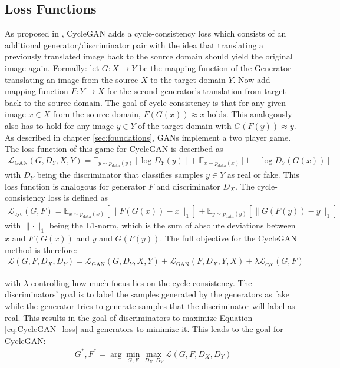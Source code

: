 \subsection{Loss Functions}
As proposed in \cite{DBLP:journals/corr/ZhuPIE17}, CycleGAN adds a cycle-consistency loss which consists of an additional generator/discriminator pair with the idea that translating a previously translated image back to the source domain should yield the original image again. Formally: let $G: X \rightarrow Y$ be the mapping function of the Generator translating an image from the source $X$ to the target domain $Y$. Now add mapping function $F: Y \rightarrow X$ for the second generator's translation from target back to the source domain. The goal of cycle-consistency is that for any given image $x\in X$ from the source domain, $F(G(x)) \approx x$ holds. This analogously also has to hold for any image $y \in Y$ of the target domain with $G(F(y)) \approx y$. As described in chapter \ref{sec:foundations}, GANs implement a two player game. 
The loss function of this game for CycleGAN is described as
\begin{align}
\mathcal{L}_{\text{GAN}}(G, D_Y, X, Y) = \mathbb{E}_{y\sim p_{\text{data}}(y)}[\log D_Y(y)] + \mathbb{E}_{x\sim p_{\text{data}}(x)}[1 - \log D_Y(G(x))]
\end{align}
with $D_Y$ being the discriminator that classifies samples $y \in Y$ as real or fake. This loss function is analogous for generator $F$ and discriminator $D_X$. The cycle-consistency loss is defined as
\begin{align}
\mathcal{L}_{\text{cyc}}(G, F) =  \mathbb{E}_{x\sim p_{\text{data}}(x)} [\lVert F(G(x))- x \rVert_1] + \mathbb{E}_{y\sim p_{\text{data}}(y)} [\lVert G(F(y))- y \rVert_1] \label{eq:GAN_loss}
\end{align}
with $\lVert \cdot \rVert_1$ being the L1-norm, which is the sum of absolute deviations between $x$ and $F(G(x))$ and $y$ and $G(F(y))$. The full objective for the CycleGAN method is therefore:
\begin{align}
\mathcal{L}(G,F,D_X,D_Y) = \mathcal{L}_{\text{GAN}}(G, D_Y, X, Y) + \mathcal{L}_{\text{GAN}}(F, D_X, Y, X) + \lambda \mathcal{L}_{\text{cyc}}(G, F) \label{eq:CycleGAN_loss}
\end{align}

with $\lambda$ controlling how much focus lies on the cycle-consistency. The discriminators' goal is to label the samples generated by the generators as fake while the generator tries to generate samples that the discriminator will label as real. This results in the goal of discriminators to maximize Equation \ref{eq:CycleGAN_loss} and generators to minimize it. This leads to the goal for CycleGAN: 
\begin{align}
G^*, F^* = \arg \underset{G,F}{\min}\underset{D_X, D_Y}{\max} \mathcal{L}(G,F,D_X,D_Y) \label{eq:GAN_goal}
\end{align}

